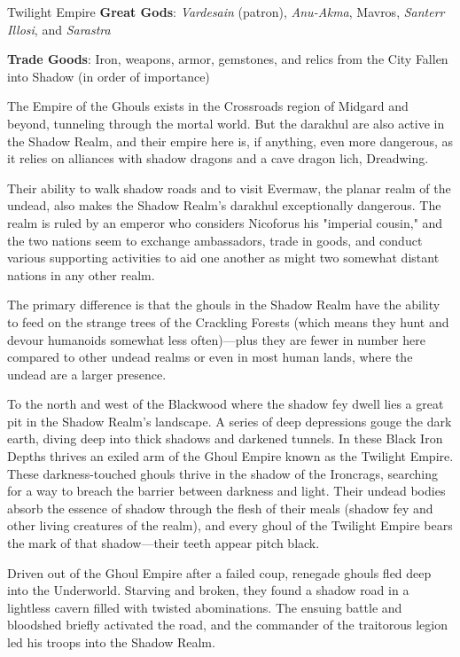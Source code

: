 \documentclass[10pt,a4paper,twoside,bg=print,twocolumn,openany,nodeprecatedcode]{dndbook}
\begin{document}
\begin{DndSidebar}[float=!b]{Twilight Empire}
\textbf{Great Gods}: \textit{Vardesain} (patron), \textit{Anu-Akma}, Mavros, \textit{Santerr Illosi}, and \textit{Sarastra}



\textbf{Trade Goods}: Iron, weapons, armor, gemstones, and relics from the City Fallen into Shadow (in order of importance)





\end{DndSidebar}

The Empire of the Ghouls exists in the Crossroads region of Midgard and beyond, tunneling through the mortal world. But the darakhul are also active in the Shadow Realm, and their empire here is, if anything, even more dangerous, as it relies on alliances with shadow dragons and a cave dragon lich, Dreadwing.

Their ability to walk shadow roads and to visit Evermaw, the planar realm of the undead, also makes the Shadow Realm's darakhul exceptionally dangerous. The realm is ruled by an emperor who considers Nicoforus his "imperial cousin," and the two nations seem to exchange ambassadors, trade in goods, and conduct various supporting activities to aid one another as might two somewhat distant nations in any other realm.

The primary difference is that the ghouls in the Shadow Realm have the ability to feed on the strange trees of the Crackling Forests (which means they hunt and devour humanoids somewhat less often)—plus they are fewer in number here compared to other undead realms or even in most human lands, where the undead are a larger presence.

To the north and west of the Blackwood where the shadow fey dwell lies a great pit in the Shadow Realm's landscape. A series of deep depressions gouge the dark earth, diving deep into thick shadows and darkened tunnels. In these Black Iron Depths thrives an exiled arm of the Ghoul Empire known as the Twilight Empire. These darkness-touched ghouls thrive in the shadow of the Ironcrags, searching for a way to breach the barrier between darkness and light. Their undead bodies absorb the essence of shadow through the flesh of their meals (shadow fey and other living creatures of the realm), and every ghoul of the Twilight Empire bears the mark of that shadow—their teeth appear pitch black.

Driven out of the Ghoul Empire after a failed coup, renegade ghouls fled deep into the Underworld. Starving and broken, they found a shadow road in a lightless cavern filled with twisted abominations. The ensuing battle and bloodshed briefly activated the road, and the commander of the traitorous legion led his troops into the Shadow Realm.
\end{document}
